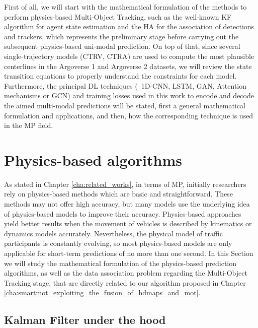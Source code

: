 First of all, we will start with the mathematical formulation of the methods to perform physics-based Multi-Object Tracking, such as the well-known \acf{KF} algorithm \cite{kalman1960new} for agent state estimation and the \ac{HA} \cite{kuhn1955hungarian} for the association of detections and trackers, which represents the preliminary stage before carrying out the subsequent physics-based uni-modal prediction. On top of that, since several single-trajectory models (\ac{CTRV}, \ac{CTRA}) are used to compute the most plausible centerlines in the Argoverse 1 \cite{chang2019argoverse} and Argoverse 2 \cite{wilson2023argoverse} datasets, we will review the state transition equations to properly understand the constraints for each model. Furthermore, the principal \ac{DL} techniques (\eg \ 1D-\ac{CNN}, \ac{LSTM}, \ac{GAN}, Attention mechanisms or \ac{GCN}) and training losses used in this work to encode and decode the aimed multi-modal predictions will be stated, first a general mathematical formulation and applications, and then, how the corresponding technique is used in the \ac{MP} field.

\section{Physics-based algorithms}
\label{sec:3_pb_formulation}


As stated in Chapter \ref{cha:related_works}, in terms of \ac{MP}, initially researchers rely on physics-based methods which are basic and straightforward. These methods may not offer high accuracy, but many models use the underlying idea of physics-based models to improve their accuracy. Physics-based approaches yield better results when the movement of vehicles is described by kinematics or dynamics models accurately. Nevertheless, the physical model of traffic participants is constantly evolving, so most physics-based models are only applicable for short-term predictions of no more than one second. In this Section we will study the mathematical formulation of the physics-based prediction algorithms, as well as the data association problem regarding the Multi-Object Tracking stage, that are directly related to our algorithm proposed in Chapter \ref{cha:smartmot_exploiting_the_fusion_of_hdmaps_and_mot}.

\subsection{Kalman Filter under the hood}
\label{subsec:3_kf_formulation}

